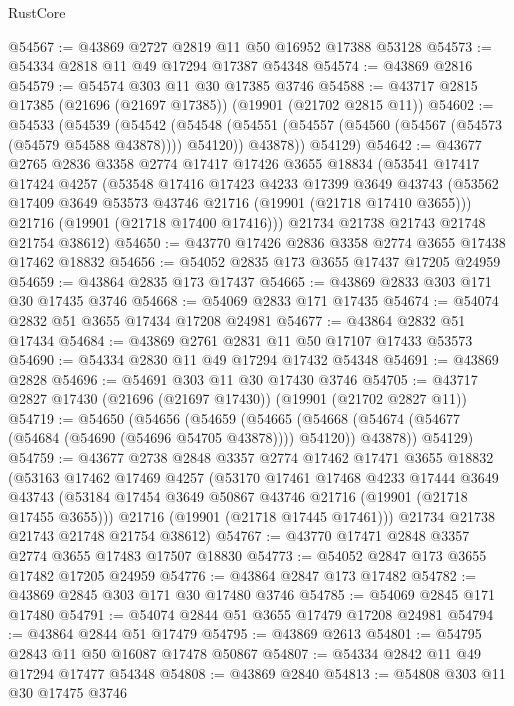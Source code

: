 \begin{lexlean}{RustCore}
\begin{coremodule}
@54567 := @43869 @2727 @2819 @11 @50 @16952 @17388 @53128
@54573 := @54334 @2818 @11 @49 @17294 @17387 @54348
@54574 := @43869 @2816
@54579 := @54574 @303 @11 @30 @17385 @3746
@54588 := @43717 @2815 @17385 (@21696 (@21697 @17385)) (@19901 (@21702 @2815 @11))
@54602 := @54533
    (@54539
      (@54542
        (@54548 (@54551 (@54557 (@54560 (@54567 (@54573 (@54579 @54588 @43878)))) @54120)) @43878))
      @54129)
@54642 := @43677
    @2765
    @2836
    @3358
    @2774
    @17417
    @17426
    @3655
    @18834
    (@53541
      @17417
      @17424
      @4257
      (@53548
        @17416
        @17423
        @4233
        @17399
        @3649
        @43743
        (@53562 @17409 @3649 @53573 @43746 @21716 (@19901 (@21718 @17410 @3655)))
        @21716
        (@19901 (@21718 @17400 @17416)))
      @21734
      @21738
      @21743
      @21748
      @21754
      @38612)
@54650 := @43770 @17426 @2836 @3358 @2774 @3655 @17438 @17462 @18832
@54656 := @54052 @2835 @173 @3655 @17437 @17205 @24959
@54659 := @43864 @2835 @173 @17437
@54665 := @43869 @2833 @303 @171 @30 @17435 @3746
@54668 := @54069 @2833 @171 @17435
@54674 := @54074 @2832 @51 @3655 @17434 @17208 @24981
@54677 := @43864 @2832 @51 @17434
@54684 := @43869 @2761 @2831 @11 @50 @17107 @17433 @53573
@54690 := @54334 @2830 @11 @49 @17294 @17432 @54348
@54691 := @43869 @2828
@54696 := @54691 @303 @11 @30 @17430 @3746
@54705 := @43717 @2827 @17430 (@21696 (@21697 @17430)) (@19901 (@21702 @2827 @11))
@54719 := @54650
    (@54656
      (@54659
        (@54665 (@54668 (@54674 (@54677 (@54684 (@54690 (@54696 @54705 @43878)))) @54120)) @43878))
      @54129)
@54759 := @43677
    @2738
    @2848
    @3357
    @2774
    @17462
    @17471
    @3655
    @18832
    (@53163
      @17462
      @17469
      @4257
      (@53170
        @17461
        @17468
        @4233
        @17444
        @3649
        @43743
        (@53184 @17454 @3649 @50867 @43746 @21716 (@19901 (@21718 @17455 @3655)))
        @21716
        (@19901 (@21718 @17445 @17461)))
      @21734
      @21738
      @21743
      @21748
      @21754
      @38612)
@54767 := @43770 @17471 @2848 @3357 @2774 @3655 @17483 @17507 @18830
@54773 := @54052 @2847 @173 @3655 @17482 @17205 @24959
@54776 := @43864 @2847 @173 @17482
@54782 := @43869 @2845 @303 @171 @30 @17480 @3746
@54785 := @54069 @2845 @171 @17480
@54791 := @54074 @2844 @51 @3655 @17479 @17208 @24981
@54794 := @43864 @2844 @51 @17479
@54795 := @43869 @2613
@54801 := @54795 @2843 @11 @50 @16087 @17478 @50867
@54807 := @54334 @2842 @11 @49 @17294 @17477 @54348
@54808 := @43869 @2840
@54813 := @54808 @303 @11 @30 @17475 @3746

\end{coremodule}
\end{lexlean}
